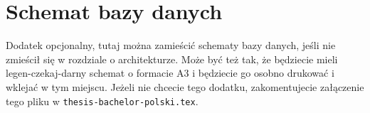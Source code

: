\chapter{Schemat bazy danych}
\label{Chapterc1}

Dodatek opcjonalny, tutaj można zamieścić schematy bazy danych, jeśli nie zmieścił się w rozdziale o architekturze. Może być też tak, że będziecie mieli legen-czekaj-darny schemat o formacie A3 i będziecie go osobno drukować i wklejać w tym miejscu. Jeżeli nie chcecie tego dodatku, zakomentujecie załączenie tego pliku w \texttt{thesis-bachelor-polski.tex}.